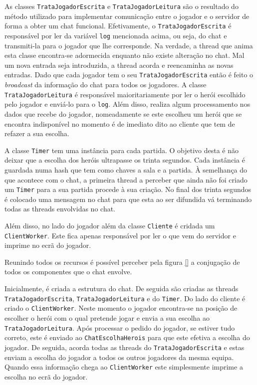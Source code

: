 \documentclass[a4paper]{article}
\begin{document}
As classes \texttt{TrataJogadorEscrita} e \texttt{TrataJogadorLeitura} são o resultado do método utilizado para implementar comunicação entre o jogador e o servidor de forma a obter um chat funcional. Efetivamente, o \texttt{TrataJogadorEscrita} é responsável por ler da variável \texttt{log} mencionada acima, ou seja, do chat e transmiti-la para o jogador que lhe corresponde. Na verdade, a thread que anima esta classe encontra-se adormecida enquanto não existe alteração no chat. Mal um nova entrada seja introduzida, a thread acorda e reencaminha as novas entradas. Dado que cada jogador tem o seu \texttt{TrataJogadorEscrita} então é feito o \textit{broadcast} da informação do chat para todos os jogadores. A classe \texttt{TrataJogadorLeitura} é responsável maioritariamente por ler o herói escolhido pelo jogador e enviá-lo para o \texttt{log}. Além disso, realiza algum processamento nos dados que recebe do jogador, nomeadamente se este escolheu um herói que se encontra indisponível no momento é de imediato dito ao cliente que tem de refazer a sua escolha.

A classe \texttt{Timer} tem uma instância para cada partida. O objetivo desta é não deixar que a escolha dos heróis ultrapasse os trinta segundos. Cada instância é guardada numa hash que tem como chaves a sala e a partida. À semelhança do que acontece com o chat, a primeira thread a perceber que ainda não foi criado um \texttt{Timer} para a sua partida procede à sua criação. No final dos trinta segundos é colocado uma mensagem no chat para que esta ao ser difundida vá terminando todas as threads envolvidas no chat.

Além disso, no lado do jogador além da classe \texttt{Cliente} é cridada um \texttt{ClientWorker}. Este fica apenas responsável por ler o que vem do servidor e imprime no ecrã do jogador.

Reunindo todos os recursos é possível perceber pela figura \ref{} a conjugação de todos os componentes que o chat envolve. 

Inicialmente, é criada a estrutura do chat. De seguida são criadas as threads \texttt{TrataJogadorEscrita}, \texttt{TrataJogadorLeitura} e do \texttt{Timer}. Do lado do cliente é criado o \texttt{ClientWorker}. Neste momento o jogador encontra-se na posição de escolher o herói com o qual pretende jogar e envia a sua escolha ao \texttt{TrataJogadorLeitura}. Após processar o pedido do jogador, se estiver tudo correto, este é enviado ao \texttt{ChatEscolhaHerois} para que este efetiva a escolha do jogador. De seguida, acorda todas as threads do \texttt{TrataJogadorEscrita} e estas enviam a escolha do jogador a todos os outros jogadores da mesma equipa. Quando essa informação chega ao \texttt{ClientWorker} este simplesmente imprime a escolha no ecrã do jogador.
\end{document}
